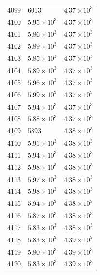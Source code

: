 \begin{table}[H]
\begin{tabular}{lll}
4099 & 6013 & $\displaystyle 4.37 \times 10^{3}$ \\
4100 & $\displaystyle 5.95 \times 10^{3}$ & $\displaystyle 4.37 \times 10^{3}$ \\
4101 & $\displaystyle 5.86 \times 10^{3}$ & $\displaystyle 4.37 \times 10^{3}$ \\
4102 & $\displaystyle 5.89 \times 10^{3}$ & $\displaystyle 4.37 \times 10^{3}$ \\
4103 & $\displaystyle 5.85 \times 10^{3}$ & $\displaystyle 4.37 \times 10^{3}$ \\
4104 & $\displaystyle 5.89 \times 10^{3}$ & $\displaystyle 4.37 \times 10^{3}$ \\
4105 & $\displaystyle 5.96 \times 10^{3}$ & $\displaystyle 4.37 \times 10^{3}$ \\
4106 & $\displaystyle 5.99 \times 10^{3}$ & $\displaystyle 4.37 \times 10^{3}$ \\
4107 & $\displaystyle 5.94 \times 10^{3}$ & $\displaystyle 4.37 \times 10^{3}$ \\
4108 & $\displaystyle 5.88 \times 10^{3}$ & $\displaystyle 4.37 \times 10^{3}$ \\
4109 & 5893 & $\displaystyle 4.38 \times 10^{3}$ \\
4110 & $\displaystyle 5.91 \times 10^{3}$ & $\displaystyle 4.38 \times 10^{3}$ \\
4111 & $\displaystyle 5.94 \times 10^{3}$ & $\displaystyle 4.38 \times 10^{3}$ \\
4112 & $\displaystyle 5.98 \times 10^{3}$ & $\displaystyle 4.38 \times 10^{3}$ \\
4113 & $\displaystyle 5.97 \times 10^{3}$ & $\displaystyle 4.38 \times 10^{3}$ \\
4114 & $\displaystyle 5.98 \times 10^{3}$ & $\displaystyle 4.38 \times 10^{3}$ \\
4115 & $\displaystyle 5.94 \times 10^{3}$ & $\displaystyle 4.38 \times 10^{3}$ \\
4116 & $\displaystyle 5.87 \times 10^{3}$ & $\displaystyle 4.38 \times 10^{3}$ \\
4117 & $\displaystyle 5.83 \times 10^{3}$ & $\displaystyle 4.38 \times 10^{3}$ \\
4118 & $\displaystyle 5.83 \times 10^{3}$ & $\displaystyle 4.39 \times 10^{3}$ \\
4119 & $\displaystyle 5.80 \times 10^{3}$ & $\displaystyle 4.39 \times 10^{3}$ \\
4120 & $\displaystyle 5.83 \times 10^{3}$ & $\displaystyle 4.39 \times 10^{3}$ \\

\end{tabular}
\end{table}
